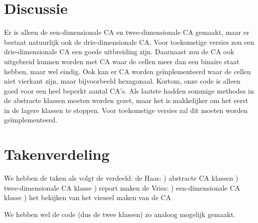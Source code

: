 \documentclass[12pt,a4paper]{article}
\begin{document}
\section*{Discussie}
Er is alleen de een-dimensionale CA en twee-dimensionale 
CA gemaakt, maar er bestaat natuurlijk ook de drie-dimensionale CA.
Voor toekomstige versies zou een drie-dimensionale CA een goede uitbreiding zijn.
Daarnaast zou de CA ook uitgebreid kunnen worden met CA waar de cellen meer dan een binaire staat hebben, maar wel eindig.
Ook kan er CA worden geïnplementeerd waar de cellen niet vierkant zijn, maar bijvoorbeeld hexagonaal.
Kortom, onze code is alleen goed voor een heel beperkt aantal CA's.
Als laatste hadden sommige methodes in de abstracte klassen moeten worden gezet, maar het 
is makkelijker om het eerst in de lagere klassen te stoppen.
Voor toekomstige versies zal dit moeten worden geïmplementeerd.  

\section*{Takenverdeling}
We hebben de taken als volgt de verdeeld:
\vspace{6pt}
\newline
de Haas:
) abstracte CA klassen
) twee-dimensionale CA klasse
) report maken
\vspace{6pt}
\newline
de Vries:
) een-dimensionale CA klasse
) het bekijken van het visueel maken van de CA

We hebben wel de code (dus de twee klassen) zo analoog mogelijk gemaakt.

  
\end{document}
